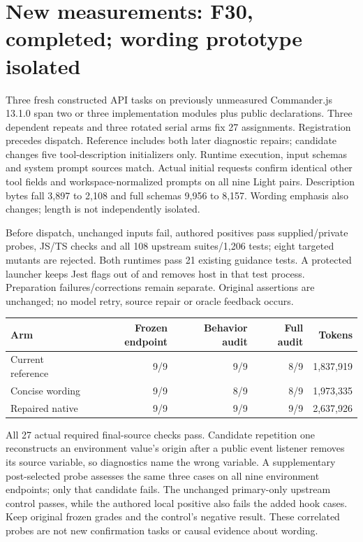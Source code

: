 \documentclass[11pt,a4paper]{article}
\newcommand{\code}[1]{\texttt{\detokenize{#1}}}
\begin{document}
\section{New measurements: F30, completed; wording prototype isolated}
Three fresh constructed API tasks on previously unmeasured Commander.js 13.1.0
span two or three implementation modules plus public declarations. Three dependent
repeats and three rotated serial arms fix 27 assignments. Registration
\code{c940d2c8} precedes dispatch. Reference \code{79bcf87f} includes both later
diagnostic repairs; candidate changes five tool-description initializers only.
Runtime execution, input schemas and system prompt sources match. Actual initial
requests confirm identical other tool fields and workspace-normalized prompts on
all nine Light pairs. Description bytes fall 3,897 to 2,108 and full schemas
9,956 to 8,157. Wording emphasis also changes; length is not independently isolated.

Before dispatch, unchanged inputs fail, authored positives pass supplied/private
probes, JS/TS checks and all 108 upstream suites/1,206 tests; eight targeted mutants
are rejected. Both runtimes pass 21 existing guidance tests. A protected launcher
keeps Jest flags out of \code{process.argv} and removes host \code{NO_COLOR} in
that test process. Preparation failures/corrections remain separate. Original
assertions are unchanged; no model retry, source repair or oracle feedback occurs.

\begin{center}\begin{tabular}{@{}lrrrr@{}}\toprule
Arm & Frozen endpoint & Behavior audit & Full audit & Tokens \\\midrule
Current reference & 9/9 & 9/9 & 8/9 & 1,837,919 \\
Concise wording & 9/9 & 8/9 & 8/9 & 1,973,335 \\
Repaired native & 9/9 & 9/9 & 9/9 & 2,637,926 \\\bottomrule
\end{tabular}\end{center}
All 27 actual required final-source checks pass. Candidate repetition one
reconstructs an environment value's origin after a public event listener removes
its source variable, so diagnostics name the wrong variable. A supplementary
post-selected probe assesses the same three cases on all nine environment
endpoints; only that candidate fails. The unchanged primary-only upstream control
passes, while the authored local positive also fails the added hook cases.
Keep original frozen grades and the control's negative result. These correlated
probes are not new confirmation tasks or causal evidence about wording.
\end{document}
